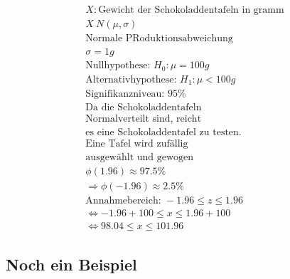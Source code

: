 \begin{align*}
    X: \text{Gewicht der Schokoladdentafeln in gramm}  \\
    X ~ N(\mu, \sigma)                                 \\
    \text{Normale PRoduktionsabweichung }              \\
    \sigma = 1g                                        \\
    \text{Nullhypothese: } H_0: \mu = 100g             \\
    \text{Alternativhypothese: } H_1: \mu < 100g       \\
    \text{Signifikanzniveau: } 95\%                    \\
    \text{Da die Schokoladdentafeln}                   \\
    \text{Normalverteilt sind, reicht}                 \\
    \text{es eine Schokoladdentafel zu testen.}        \\
    \text{Eine Tafel wird zufällig}                    \\
    \text{ausgewählt und gewogen}                      \\
    \phi(1.96) \approx 97.5\%                          \\
    \Rightarrow \phi(-1.96) \approx 2.5\%              \\
    \text{Annahmebereich: } -1.96 \leq z \leq 1.96     \\
    \Leftrightarrow -1.96 + 100 \leq x \leq 1.96 + 100 \\
    \Leftrightarrow 98.04 \leq x \leq 101.96
\end{align*}

\subsection{Noch ein Beispiel}

